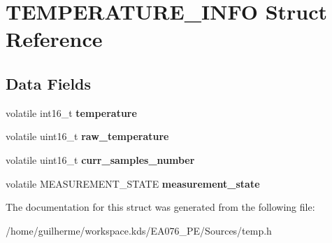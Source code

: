 \hypertarget{struct_t_e_m_p_e_r_a_t_u_r_e___i_n_f_o}{}\section{T\+E\+M\+P\+E\+R\+A\+T\+U\+R\+E\+\_\+\+I\+N\+FO Struct Reference}
\label{struct_t_e_m_p_e_r_a_t_u_r_e___i_n_f_o}
\subsection*{Data Fields}
\begin{DoxyCompactItemize}
\item 
\mbox{\label{struct_t_e_m_p_e_r_a_t_u_r_e___i_n_f_o_aeece7913de74e489bef841fa4e4715be}} 
volatile int16\+\_\+t {\bfseries temperature}
\item 
\mbox{\label{struct_t_e_m_p_e_r_a_t_u_r_e___i_n_f_o_a7cacd269792e1aa80ef981d04dec3776}} 
volatile uint16\+\_\+t {\bfseries raw\+\_\+temperature}
\item 
\mbox{\label{struct_t_e_m_p_e_r_a_t_u_r_e___i_n_f_o_af777df7070212835dbd30b370bb1cf38}} 
volatile uint16\+\_\+t {\bfseries curr\+\_\+samples\+\_\+number}
\item 
\mbox{\label{struct_t_e_m_p_e_r_a_t_u_r_e___i_n_f_o_a3386f43705c84f0a58757d8ea9d5e68f}} 
volatile M\+E\+A\+S\+U\+R\+E\+M\+E\+N\+T\+\_\+\+S\+T\+A\+TE {\bfseries measurement\+\_\+state}
\end{DoxyCompactItemize}


The documentation for this struct was generated from the following file\+:\begin{DoxyCompactItemize}
\item 
/home/guilherme/workspace.\+kds/\+E\+A076\+\_\+\+P\+E/\+Sources/temp.\+h\end{DoxyCompactItemize}
